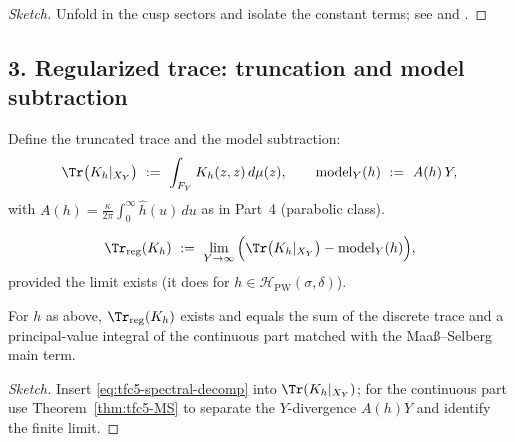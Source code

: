 \begin{proof}[Sketch]\relax\hspace{0pt}
Unfold in the cusp sectors and isolate the constant terms; see \cite[Ch.~3]{HejhalII} and \cite{LaxPhillips}. \relax\hspace{0pt}
\end{proof}

\subsection*{3. Regularized trace: truncation and model subtraction}\relax\hspace{0pt}
\label{subsec:tfc5-trreg} %

Define the truncated trace and the model subtraction:
\begin{equation}\relax\hspace{0pt}
\label{eq:tfc5-trY}\relax\hspace{0pt}
\Tr\big(K_h|_{X_Y}\big)\ :=\ \int_{F_Y} K_h(z,z)\,d\mu(z),\qquad
\mathrm{model}_Y(h)\ :=\ A(h)\,Y,
\end{equation}
with $A(h)=\frac{\kappa}{2\pi}\int_0^\infty \widehat{h}(u)\,du$ as in Part~4 (parabolic class). \relax\hspace{0pt}
\begin{definition}\relax\hspace{0pt}
\label{def:tfc5-trreg} %
\[
\Tr_{\mathrm{reg}}(K_h)\ :=\ \lim_{Y\to\infty} \Big(\Tr\big(K_h|_{X_Y}\big)-\mathrm{model}_Y(h)\Big),
\]
provided the limit exists (it does for $h\in\mathcal{H}_{\mathrm{PW}}(\sigma,\delta)$). \relax\hspace{0pt}
\end{definition}

\begin{proposition}\relax\hspace{0pt}
\label{prop:tfc5-exist-trreg} %
For $h$ as above, $\Tr_{\mathrm{reg}}(K_h)$ exists and equals the sum of the discrete trace and a principal-value integral of the continuous part matched with the Maaß--Selberg main term. \relax\hspace{0pt}
\end{proposition}

\begin{proof}[Sketch]\relax\hspace{0pt}
Insert \eqref{eq:tfc5-spectral-decomp} into $\Tr(K_h|_{X_Y})$; for the continuous part use Theorem~\ref{thm:tfc5-MS} to separate the $Y$-divergence $A(h)Y$ and identify the finite limit. \relax\hspace{0pt}
\end{proof}

